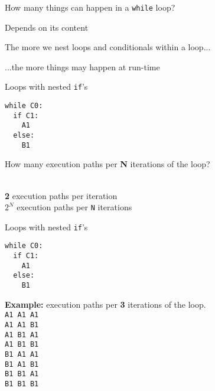 \documentclass{beamer}
\begin{document}
\begin{slide}{
\item How many things can happen in a \texttt{while} loop?
\item Depends on its content
}\end{slide}

\begin{slide}{
\item The more we nest loops and conditionals within a loop...
\pause
\item ...the more things may happen at run-time
}\end{slide}

\begin{frame}[fragile]{Loops with nested \texttt{if}'s}
\begin{lstlisting}[frame=shadowbox,basicstyle=\ttfamily\tiny]
while C0:
  if C1:
    A1
  else:
    B1
\end{lstlisting}

How many execution paths per \textbf{N} iterations of the loop? \\ \ \\

\pause

\textbf{2} execution paths per iteration \\
\textbf{$2^N$} execution paths per \texttt{N} iterations \\
\end{frame}

\begin{frame}[fragile]{Loops with nested \texttt{if}'s}
\begin{lstlisting}[frame=shadowbox,basicstyle=\ttfamily\tiny]
while C0:
  if C1:
    A1
  else:
    B1
\end{lstlisting}

\textbf{Example:} execution paths per \textbf{3} iterations of the loop. \\

\texttt{A1 A1 A1} \\
\texttt{A1 A1 B1} \\
\texttt{A1 B1 A1} \\
\texttt{A1 B1 B1} \\
\texttt{B1 A1 A1} \\
\texttt{B1 A1 B1} \\
\texttt{B1 B1 A1} \\
\texttt{B1 B1 B1} \\

\end{frame}
\end{document}
